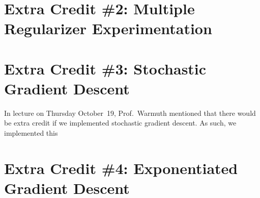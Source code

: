 \documentclass{report}
\begin{document}
  \section{Extra Credit \#2: Multiple Regularizer Experimentation}

  \section{Extra Credit \#3: Stochastic Gradient Descent}
  
  In lecture on Thursday October~19, Prof.~Warmuth mentioned that there would be extra credit if we implemented stochastic gradient descent.  As such, we implemented this 
    
  \section{Extra Credit \#4: Exponentiated Gradient Descent}
 
\end{document}
